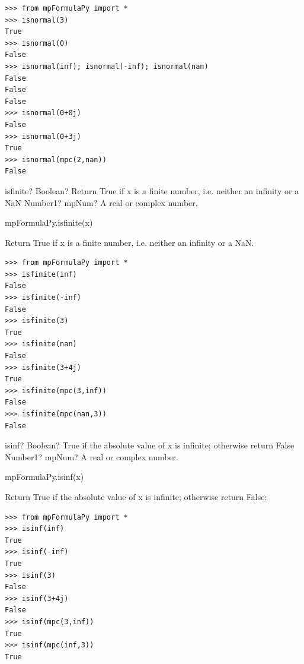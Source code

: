 \begin{lstlisting}
>>> from mpFormulaPy import *
>>> isnormal(3)
True
>>> isnormal(0)
False
>>> isnormal(inf); isnormal(-inf); isnormal(nan)
False
False
False
>>> isnormal(0+0j)
False
>>> isnormal(0+3j)
True
>>> isnormal(mpc(2,nan))
False
\end{lstlisting}





\begin{mpFunctionsExtract}
	\mpFunctionOne
	{isfinite? Boolean?  Return True if x is a finite number, i.e. neither an infinity or a NaN}
	{Number1? mpNum? A real or complex number.}
\end{mpFunctionsExtract}



mpFormulaPy.isfinite(x)

\vpara
Return True if x is a finite number, i.e. neither an infinity or a NaN.

\begin{lstlisting}
>>> from mpFormulaPy import *
>>> isfinite(inf)
False
>>> isfinite(-inf)
False
>>> isfinite(3)
True
>>> isfinite(nan)
False
>>> isfinite(3+4j)
True
>>> isfinite(mpc(3,inf))
False
>>> isfinite(mpc(nan,3))
False
\end{lstlisting}


\begin{mpFunctionsExtract}
	\mpFunctionOne
	{isinf? Boolean?  True if the absolute value of x is infinite; otherwise return False}
	{Number1? mpNum? A real or complex number.}
\end{mpFunctionsExtract}


mpFormulaPy.isinf(x)

\vpara
Return True if the absolute value of x is infinite; otherwise return False:

\begin{lstlisting}
>>> from mpFormulaPy import *
>>> isinf(inf)
True
>>> isinf(-inf)
True
>>> isinf(3)
False
>>> isinf(3+4j)
False
>>> isinf(mpc(3,inf))
True
>>> isinf(mpc(inf,3))
True
\end{lstlisting}




